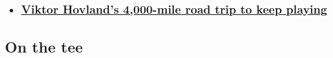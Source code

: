 \begin{itemize}
\item
  \hypertarget{viktor-hovlands-4000-mile-road-trip-to-keep-playing}{%
  \subsubsection{\texorpdfstring{\href{/2020/07/31/golf/viktor-hovland-road-trip-driving-golf-spt-intl/index.html}{Viktor
  Hovland's 4,000-mile road trip to keep
  playing}}{Viktor Hovland's 4,000-mile road trip to keep playing}}\label{viktor-hovlands-4000-mile-road-trip-to-keep-playing}}
\end{itemize}

\hypertarget{on-the-tee-}{%
\subsection{On the tee~}\label{on-the-tee-}}

